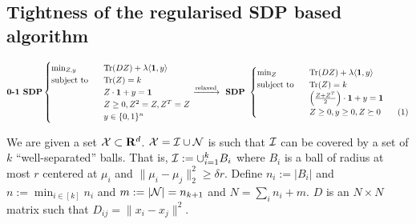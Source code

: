 \subsection{Tightness of the regularised SDP based algorithm}
\begin{equation*}
	\textbf{0-1 SDP} 
	\begin{cases}
		\min_{Z, y} \enspace &\tr(DZ) + \lambda \langle \mb 1, y\rangle\\
		\text{subject to } \enspace &\tr(Z) = k\\
		& Z\cdot \mb 1 + y = \mb 1\\	
		&Z\ge 0, Z^2 = Z, Z^T = Z \\
		& y \in \{0, 1\}^n
	\end{cases}
	\xrightarrow{\text{relaxed}} \textbf{ SDP } 
	\begin{cases}
		\min_{Z} \enspace &\tr(DZ) + \lambda \langle \mb 1, y\rangle\\
        \text{subject to } \enspace &\tr(Z) = k\\
		& \Big(\frac{Z+Z^T}{2}\Big)\cdot \mb 1 + y = \mb 1\\		
		&Z \ge 0, y \ge 0, Z \succeq 0 \numberthis\label{a-eqn:regularisedSDP}
	\end{cases}
\end{equation*}

We are given a set $\mathcal X \subset \mathbf R^d$. $\mathcal X = \mathcal I \cup \mathcal N$ is such that $\mathcal I$ can be covered by a set of $k$ ``well-separated'' balls. That is, $\mathcal I := \cup_{i=1}^k B_i$ where $B_i$ is a ball of radius at most $r$ centered at $\mu_i$ and $\|\mu_i - \mu_j\|_{2}^{2} \ge \delta r$. %
Define $n_i := |B_i|$ and $n := \min_{i\in[k]} n_i$ and $m := |\mathcal N| = n_{k+1}$ and $N = \sum_i n_i + m$. $D$ is an $N\times N$ matrix such that $D_{ij} = \|x_i -x_j\|^2$.  

